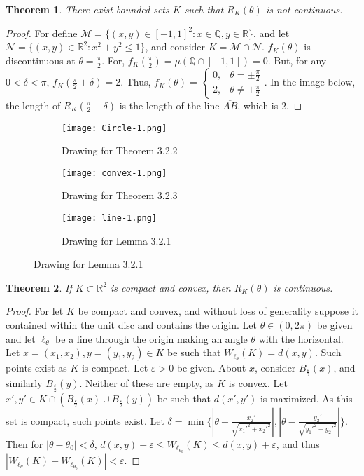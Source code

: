 \documentclass[crop=false,class=book]{standalone}
\theoremstyle{mystyle}
\newtheorem{theorem}{Theorem}[section]
\begin{document}
\begin{theorem}
There exist bounded sets $K$ such that $R_K(\theta)$ is not continuous.
\end{theorem}
\begin{proof}
For define $\mathcal{M} = \{(x,y)\in [-1,1]^2: x\in \mathbb{Q},y\in \mathbb{R}\}$, and let $\mathcal{N} = \{(x,y)\in \mathbb{R}^2: x^2+y^2\leq 1\}$, and consider $K = \mathcal{M}\cap \mathcal{N}$. $f_{K}(\theta)$ is discontinuous at $\theta = \frac{\pi}{2}$. For, $f_K(\frac{\pi}{2}) = \mu(\mathbb{Q}\cap [-1,1])=0$. But, for any $0<\delta < \pi$, $f_K(\frac{\pi}{2}\pm\delta) = 2$. Thus, $f_K(\theta) = \begin{cases} 0, & \theta = \pm \frac{\pi}{2} \\ 2, & \theta \ne \pm \frac{\pi}{2}\end{cases}$. In the image below, the length of $R_K(\frac{\pi}{2}-\delta)$ is the length of the line $\overline{AB}$, which is 2.
\end{proof}
\begin{figure}[H]
  \begin{subfigure}[b]{0.32\textwidth}
     \centering
    \texttt{[image: Circle-1.png]}
    \caption{Drawing for Theorem 3.2.2}
  \end{subfigure}
  \begin{subfigure}[b]{0.32\textwidth}
    \centering
    \texttt{[image: convex-1.png]}
    \caption{Drawing for Theorem 3.2.3}
  \end{subfigure}
  \begin{subfigure}[b]{0.32\textwidth}
    \centering
    \texttt{[image: line-1.png]}
    \caption{Drawing for Lemma 3.2.1}
  \end{subfigure}  
\end{figure}
\begin{theorem}
If $K\subset \mathbb{R}^2$ is compact and convex, then $R_K(\theta)$ is continuous.
\end{theorem}
\begin{proof}
For let $K$ be compact and convex, and without loss of generality suppose it contained within the unit disc and contains the origin. Let $\theta\in (0,2\pi)$ be given and let $\ell_{\theta}$ be a line through the origin making an angle $\theta$ with the horizontal. Let $x=(x_1,x_2),y=(y_1,y_2)\in K$ be such that $W_{\ell_{\theta}}(K) = d(x,y)$. Such points exist as $K$ is compact. Let $\varepsilon>0$ be given. About $x$, consider $B_{\frac{\varepsilon}{2}}(x)$, and similarly $B_{\frac{\varepsilon}{2}}(y)$. Neither of these are empty, as $K$ is convex. Let $x',y'\in K\cap(B_{\frac{\varepsilon}{2}}(x)\cup B_{\frac{\varepsilon}{2}}(y))$ be such that $d(x',y')$ is maximized. As this set is compact, such points exist. Let $\delta = \min\{|\theta-\frac{x_2'}{\sqrt{x_1'^2+x_2'^2}}|,|\theta-\frac{y_2'}{\sqrt{y_1'^2+y_2'^2}}|\}$. Then for $|\theta-\theta_0|<\delta$, $d(x,y)-\varepsilon \leq W_{\ell_{\theta_0}}(K)\leq d(x,y)+\varepsilon$, and thus $|W_{\ell_\theta}(K)-W_{\ell_{\theta_0}}(K)| < \varepsilon$.
\end{proof}
\end{document}
